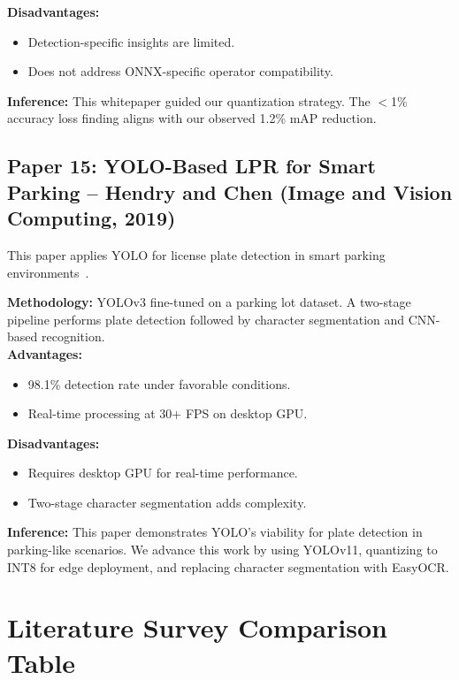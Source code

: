\documentclass[11pt]{report}
\begin{document}
\textbf{Disadvantages:}
\begin{itemize}
    \item Detection-specific insights are limited.
    \item Does not address ONNX-specific operator compatibility.
\end{itemize}

\textbf{Inference:}
This whitepaper guided our quantization strategy. The $<$1\% accuracy loss finding aligns with our observed 1.2\% mAP reduction.

\subsection{Paper 15: YOLO-Based LPR for Smart Parking -- Hendry and Chen (Image and Vision Computing, 2019)}
This paper applies YOLO for license plate detection in smart parking environments~\cite{hendry2019}. \par

\textbf{Methodology:} YOLOv3 fine-tuned on a parking lot dataset. A two-stage pipeline performs plate detection followed by character segmentation and CNN-based recognition. \\

\textbf{Advantages:}
\begin{itemize}
    \item 98.1\% detection rate under favorable conditions.
    \item Real-time processing at 30+ FPS on desktop GPU.
\end{itemize}

\textbf{Disadvantages:}
\begin{itemize}
    \item Requires desktop GPU for real-time performance.
    \item Two-stage character segmentation adds complexity.
\end{itemize}

\textbf{Inference:}
This paper demonstrates YOLO's viability for plate detection in parking-like scenarios. We advance this work by using YOLOv11, quantizing to INT8 for edge deployment, and replacing character segmentation with EasyOCR.

\section{Literature Survey Comparison Table}
\end{document}
